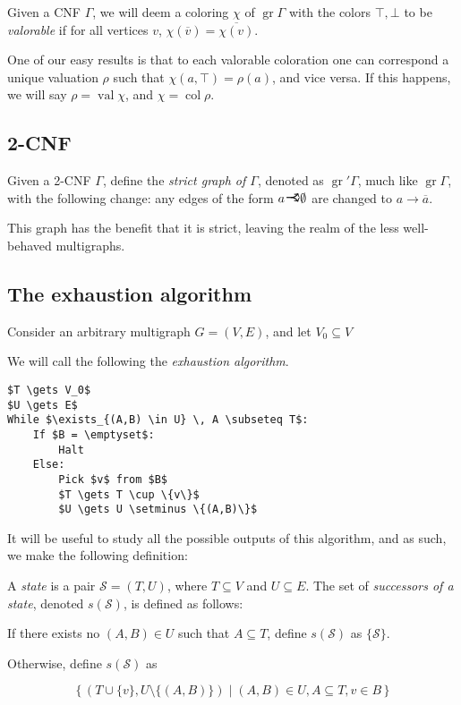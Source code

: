 \documentclass[11pt]{article}
\newcommand{\conj}[1]{\overline{#1}}
\newcommand{\cS}{\mathcal{S}}
\DeclareMathOperator{\gr}{gr}
\DeclareMathOperator{\val}{val}
\DeclareMathOperator{\col}{col}
\newcommand{\rightcurveor}{
\!
\mathrel{
  \begin{tikzpicture}[scale=0.8]
    \draw[thick,->] (0,0) arc (90:150:-2ex);
    \draw[thick,->] (0,0) arc (90:30:2ex);
    \draw[thick] (-1ex, 0) -- (0.1ex,0);
  \end{tikzpicture}
}\!
}
\begin{document}
Given a CNF $\Gamma$, we will deem a coloring $\chi$ of $\gr \Gamma$ with the colors $\top, \bot$ to be \emph{valorable} if for all vertices $v$, $\chi(\conj v) = \conj{\chi(v)}$.

One of our easy results is that to each valorable coloration one can correspond a unique valuation $\rho$ such that $\chi(a, \top) = \rho(a)$, and vice versa. If this happens, we will say $\rho = \val \chi$, and $\chi = \col \rho$.

\subsection{2-CNF}

Given a 2-CNF $\Gamma$, define the \emph{strict graph of $\Gamma$}, denoted as $\gr' \Gamma$, much like $\gr \Gamma$, with the following change: any edges of the form $a \rightcurveor \emptyset$ are changed to $a \rightarrow \conj a$.

This graph has the benefit that it is strict, leaving the realm of the less well-behaved multigraphs.

\subsection{The exhaustion algorithm}

Consider an arbitrary multigraph $G = (V,E)$, and let $V_0 \subseteq V$

We will call the following the \emph{exhaustion algorithm}.

\begin{lstlisting}[mathescape]
$T \gets V_0$
$U \gets E$
While $\exists_{(A,B) \in U} \, A \subseteq T$:
    If $B = \emptyset$:
        Halt
    Else:
        Pick $v$ from $B$
        $T \gets T \cup \{v\}$
        $U \gets U \setminus \{(A,B)\}$
\end{lstlisting}

It will be useful to study all the possible outputs of this algorithm, and as such, we make the following definition:

A \emph{state} is a pair $\cS = (T,U)$, where $T \subseteq V$ and $U \subseteq E$. The set of \emph{successors of a state}, denoted $s(\cS)$, is defined as follows:

If there exists no $(A,B) \in U$ such that $A \subseteq T$, define $s(\cS)$ as $\{\cS\}$.

Otherwise, define $s(\cS)$ as

\[ \{ \, (T \cup \{v\}, U \setminus \{(A,B)\}) \mid (A,B) \in U, A \subseteq T, v \in B \, \}\]
\end{document}
